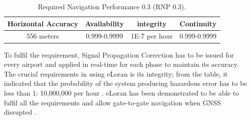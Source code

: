 \begin{table}[h!]
\centering
\caption{Required Navigation Performance 0.3 (RNP 0.3).}
\begin{tabular}{||c c c c||} 
 \hline
Horizontal Accuracy & Availability & integrity & Continuity \\ [0.5ex] 
 \hline\hline
556 meters & 0.999-0.9999 & 1E-7 per hour & 0.999-0.9999 \\ [1ex]
 \hline
\end{tabular}
\label{table:1}
\end{table}

\noindent To fulfil the requirement, Signal Propagation Correction has to be issued for every airport and applied in real-time for each phase to maintain its accuracy. The crucial requirements in using eLoran is its integrity; from the table, it indicated that the probability of the system producing hazardous error has to be less than 1: 10,000,000 per hour \cite{InternationalLORANAssociation2007EnhancedApril}. eLoran has been demonstrated to be able to fulfil all the requirements and allow gate-to-gate navigation when GNSS disrupted \cite{InternationalLORANAssociation2007EnhancedApril}\cite{Narins2014TheBoard}.\\

